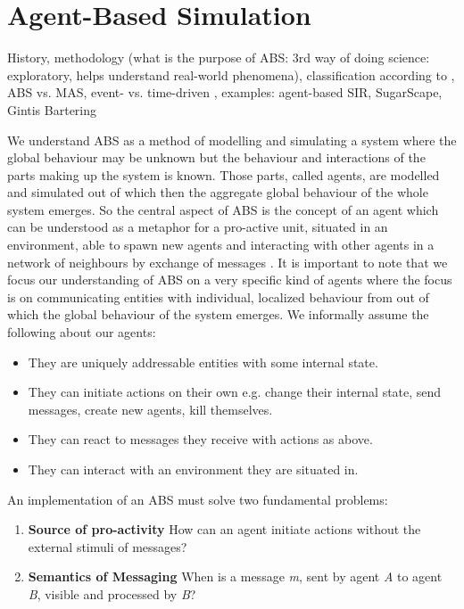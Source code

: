 \section{Agent-Based Simulation}
History, methodology (what is the purpose of ABS: 3rd way of doing science: exploratory, helps understand real-world phenomena), classification according to \cite{macal_everything_2016}, ABS vs. MAS, event- vs. time-driven \cite{meyer_event-driven_2014}, examples: agent-based SIR, SugarScape, Gintis Bartering

We understand ABS as a method of modelling and simulating a system where the global behaviour may be unknown but the behaviour and interactions of the parts making up the system is known. Those parts, called agents, are modelled and simulated out of which then the aggregate global behaviour of the whole system emerges. So the central aspect of ABS is the concept of an agent which can be understood as a metaphor for a pro-active unit, situated in an environment, able to spawn new agents and interacting with other agents in a network of neighbours by exchange of messages \cite{wooldridge_introduction_2009}. It is important to note that we focus our understanding of ABS on a very specific kind of agents where the focus is on communicating entities with individual, localized behaviour from out of which the global behaviour of the system emerges. We informally assume the following about our agents:

\begin{itemize}
	\item They are uniquely addressable entities with some internal state.
	\item They can initiate actions on their own e.g. change their internal state, send messages, create new agents, kill themselves.
	\item They can react to messages they receive with actions as above.
	\item They can interact with an environment they are situated in.
\end{itemize} 

An implementation of an ABS must solve two fundamental problems:

\begin{enumerate}
	\item \textbf{Source of pro-activity} How can an agent initiate actions without the external stimuli of messages?
	\item \textbf{Semantics of Messaging} When is a message \textit{m}, sent by agent \textit{A} to agent \textit{B}, visible and processed by \textit{B}?
\end{enumerate}

